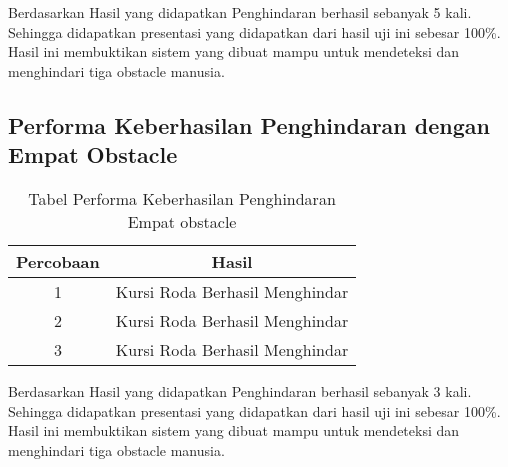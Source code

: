 Berdasarkan Hasil yang didapatkan Penghindaran berhasil sebanyak 5 kali. Sehingga didapatkan presentasi yang didapatkan dari hasil uji ini sebesar 100\%. Hasil ini membuktikan sistem yang dibuat mampu untuk mendeteksi dan menghindari tiga obstacle manusia.

\subsection{Performa Keberhasilan Penghindaran dengan Empat Obstacle}
\begin{table}[H]
    \centering
    \caption{Tabel Performa Keberhasilan Penghindaran Empat obstacle}
    \label{tb:mantapkali3}
    \begin{tabular}{|c|c|}
    \hline
    Percobaan & Hasil                                                  \\ \hline
    1         & \cellcolor[HTML]{9AFF99}Kursi Roda Berhasil Menghindar \\ \hline
    2         & \cellcolor[HTML]{9AFF99}Kursi Roda Berhasil Menghindar \\ \hline
    3         & \cellcolor[HTML]{9AFF99}Kursi Roda Berhasil Menghindar \\ \hline
    \end{tabular}
    \end{table}

Berdasarkan Hasil yang didapatkan Penghindaran berhasil sebanyak 3 kali. Sehingga didapatkan presentasi yang didapatkan dari hasil uji ini sebesar 100\%. Hasil ini membuktikan sistem yang dibuat mampu untuk mendeteksi dan menghindari tiga obstacle manusia.
